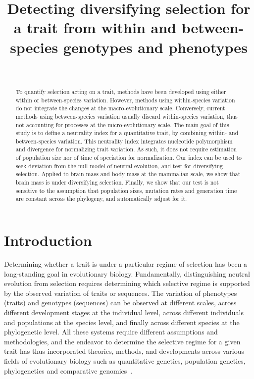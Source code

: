 \documentclass{article}
\title{Detecting diversifying selection for a trait from within and between-species genotypes and phenotypes}
\author{~}
\begin{document}
\maketitle

\begin{abstract}
    To quantify selection acting on a trait, methods have been developed using either within or between-species variation.
    However, methods using within-species variation do not integrate the changes at the macro-evolutionary scale.
    Conversely, current methods using between-species variation usually discard within-species variation, thus not accounting for processes at the micro-evolutionary scale.
    The main goal of this study is to define a neutrality index for a quantitative trait, by combining within- and between-species variation.
    This neutrality index integrates nucleotide polymorphism and divergence for normalizing trait variation.
    As such, it does not require estimation of population size nor of time of speciation for normalization.
    Our index can be used to seek deviation from the null model of neutral evolution, and test for diversifying selection.
    Applied to brain mass and body mass at the mammalian scale, we show that brain mass is under diversifying selection.
    Finally, we show that our test is not sensitive to the assumption that population sizes, mutation rates and generation time are constant across the phylogeny, and automatically adjust for it.
\end{abstract}


\section*{Introduction}\label{sec:introduction}

Determining whether a trait is under a particular regime of selection has been a long-standing goal in evolutionary biology.
Fundamentally, distinguishing neutral evolution from selection requires determining which selective regime is supported by the observed variation of traits or sequences.
The variation of phenotypes (traits) and genotypes (sequences) can be observed at different scales, across different development stages at the individual level, across different individuals and populations at the species level, and finally across different species at the phylogenetic level.
All these systems require different assumptions and methodologies, and the endeavor to determine the selective regime for a given trait has thus incorporated theories, methods, and developments across various fields of evolutionary biology such as quantitative genetics, population genetics, phylogenetics and comparative genomics~\citep{lynch_genetics_1998, walsh_evolution_2018}.
\end{document}

